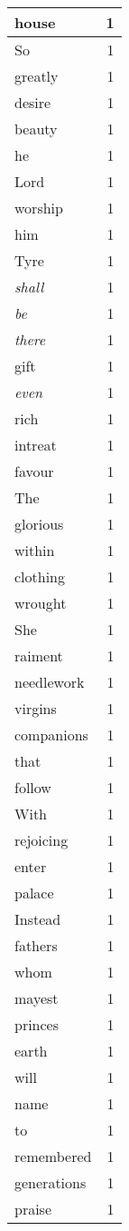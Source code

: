 \begin{center}
\begin{longtable}{l|r}
house & 1\\ \hline 
So & 1\\ \hline 
greatly & 1\\ \hline 
desire & 1\\ \hline 
beauty & 1\\ \hline 
he & 1\\ \hline 
Lord & 1\\ \hline 
worship & 1\\ \hline 
him & 1\\ \hline 
Tyre & 1\\ \hline 
\emph{shall} & 1\\ \hline 
\emph{be} & 1\\ \hline 
\emph{there} & 1\\ \hline 
gift & 1\\ \hline 
\emph{even} & 1\\ \hline 
rich & 1\\ \hline 
intreat & 1\\ \hline 
favour & 1\\ \hline 
The & 1\\ \hline 
glorious & 1\\ \hline 
within & 1\\ \hline 
clothing & 1\\ \hline 
wrought & 1\\ \hline 
She & 1\\ \hline 
raiment & 1\\ \hline 
needlework & 1\\ \hline 
virgins & 1\\ \hline 
companions & 1\\ \hline 
that & 1\\ \hline 
follow & 1\\ \hline 
With & 1\\ \hline 
rejoicing & 1\\ \hline 
enter & 1\\ \hline 
palace & 1\\ \hline 
Instead & 1\\ \hline 
fathers & 1\\ \hline 
whom & 1\\ \hline 
mayest & 1\\ \hline 
princes & 1\\ \hline 
earth & 1\\ \hline 
will & 1\\ \hline 
name & 1\\ \hline 
to & 1\\ \hline 
remembered & 1\\ \hline 
generations & 1\\ \hline 
praise & 1\\ \hline 
\end{longtable}
\end{center}



